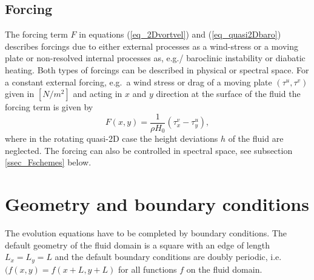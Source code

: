 \subsection{Forcing}
The forcing term $F$ in equations (\ref{eq_2Dvortvel}) and 
(\ref{eq_quasi2Dbaro}) describes forcings due to either 
external processes as a wind-stress or a moving plate or
non-resolved internal processes as, e.g./ baroclinic instability 
or diabatic heating. Both types of forcings can be described 
in physical or spectral space. For a constant external forcing, 
e.g.\ a wind stress or drag of a moving plate $(\tau^{u},\tau^{v})$ 
given in $[N/m^{2}]$ and acting in $x$ and $y$ direction at the surface 
of the fluid the forcing term is given by 
\begin{equation} \label{eq_Fstressdrag}
 F(x,y) = \frac{1}{\rho H_{0}} \left( \tau_{x}^{v} - \tau_{y}^{u} \right),
\end{equation}
where in the rotating quasi-2D case the height deviations $h$ of the
fluid are neglected. The forcing can also be controlled in spectral
space, see subsection \ref{ssec_Fschemes} below. 

\section{Geometry and boundary conditions}
The evolution equations have to be completed by boundary conditions.  
The default geometry of the fluid domain is a square with an edge of length
$L_{x} = L_{y} = L$ and the default boundary conditions are doubly periodic,  
i.e.\ $(f(x,y) = f(x+L,y+L)$ for all functions $f$ on the fluid domain.
